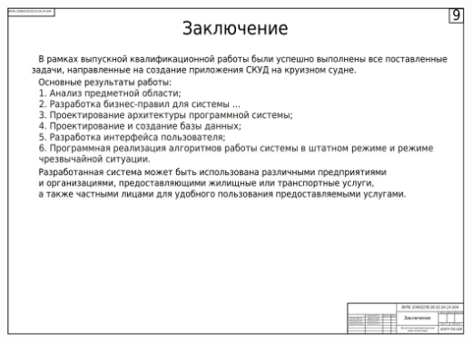 \begin{landscape}
\begin{плакат}
	\includegraphics[width=0.82\linewidth]{images/плакат9.png}
	\label{fig:9}
\end{плакат}

\end{landscape}
